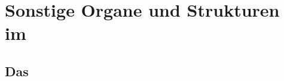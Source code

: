  
% 
 


\clearpage %
\section[Sonstige Strukturen im Bauchraum]{Sonstige Organe und Strukturen im }
\label{topic:sonstige-strukturen}
\label{topic:sonstige-bauchorgane}



\subsection{Das }

